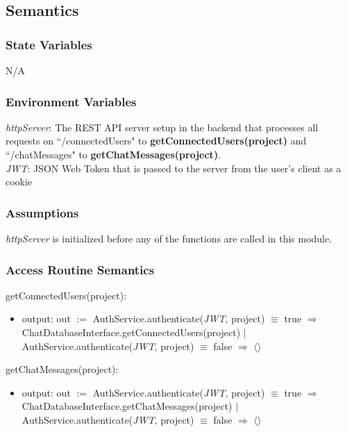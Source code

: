 \documentclass[12pt, titlepage]{article}
\begin{document}
	\subsection{Semantics}
	
	\subsubsection{State Variables}
	
	N/A
	
	\subsubsection{Environment Variables}
	
	\textit{httpServer}: The REST API server setup in the backend that processes all requests on ``/connectedUsers" to \textbf{getConnectedUsers(project)} and ``/chatMessages" to \textbf{getChatMessages(project)}.\\
	
	\noindent \textit{JWT}: JSON Web Token that is passed to the server from the user's client as a cookie
	
	\subsubsection{Assumptions}
	
	\textit{httpServer} is initialized before any of the functions are called in this module.
	
	\subsubsection{Access Routine Semantics}
	
	\noindent getConnectedUsers(project):
	\begin{itemize}
		
		\item output: out $:=$ AuthService.authenticate(\textit{JWT}, project) $\equiv$ true $\Rightarrow$ ChatDatabaseInterface.getConnectedUsers(project) $|$
		AuthService.authenticate(\textit{JWT}, project) $\equiv$ false $\Rightarrow$ $\langle \rangle$
		
	\end{itemize}
	
	\noindent getChatMessages(project):
	\begin{itemize}
		\item output: out $:=$ AuthService.authenticate(\textit{JWT}, project) $\equiv$ true $\Rightarrow$ ChatDatabaseInterface.getChatMessages(project) $|$
		AuthService.authenticate(\textit{JWT}, project) $\equiv$ false $\Rightarrow$ $\langle \rangle$
	\end{itemize}
	
\end{document}
